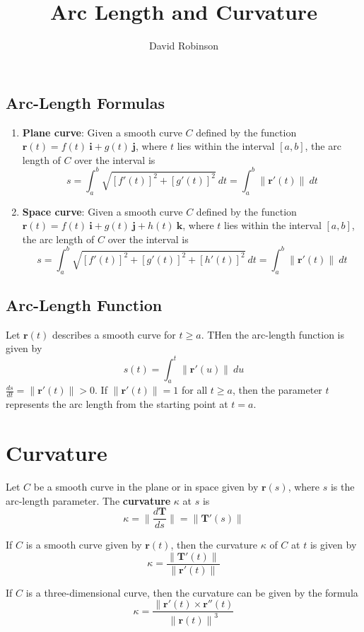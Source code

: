 \documentclass{article}
\title{Arc Length and Curvature}
\author{David Robinson}
\date{}
\begin{document}
\maketitle

\subsection*{Arc-Length Formulas}
\begin{enumerate}
    \item \textbf{Plane curve}: Given a smooth curve $C$ defined by the function $\mathbf{r}(t)=f(t)\:\mathbf{i}+g(t)\:\mathbf{j}$, where $t$ lies within the interval $[a, b]$, the arc length of $C$ over the interval is
    \[s=\int_a^b\sqrt{{[f'(t)]}^2+{[g'(t)]}^2}\: dt=\int_a^b\|\mathbf{r}'(t)\|\: dt\]
    \item \textbf{Space curve}: Given a smooth curve $C$ defined by the function $\mathbf{r}(t)=f(t)\:\mathbf{i}+g(t)\:\mathbf{j}+h(t)\:\mathbf{k}$, where $t$ lies within the interval $[a, b]$, the arc length of $C$ over the interval is
    \[s=\int_a^b\sqrt{{[f'(t)]}^2+{[g'(t)]}^2+{[h'(t)]}^2}\: dt=\int_a^b\|\mathbf{r}'(t)\|\: dt\]
\end{enumerate}

\subsection*{Arc-Length Function}
Let $\mathbf{r}(t)$ describes a smooth curve for $t\geq a$. THen the arc-length function is given by
\[s(t)=\int_a^t\|\mathbf{r}'(u)\|\: du\]
$\frac{ds}{dt}=\|\mathbf{r}'(t)\|>0$. If $\|\mathbf{r}'(t)\|=1$ for all $t\geq a$, then the parameter $t$ represents the arc length from the starting point at $t=a$.

\section*{Curvature}

Let $C$ be a smooth curve in the plane or in space given by $\mathbf{r}(s)$, where $s$ is the arc-length parameter. The \textbf{curvature} $\kappa$ at $s$ is
\[\kappa = \bigg\|\frac{d\mathbf{T}}{ds}\bigg\|=\|\mathbf{T}'(s)\|\]

If $C$ is a smooth curve given by $\mathbf{r}(t)$, then the curvature $\kappa$ of $C$ at $t$ is given by
\[\kappa = \frac{\|\mathbf{T}'(t)\|}{\|\mathbf{r}'(t)\|}\]

If $C$ is a three-dimensional curve, then the curvature can be given by the formula
\[\kappa = \frac{\|\mathbf{r}'(t)\times \mathbf{r}''(t)}{{\|\mathbf{r}(t)\|}^3}\]
\end{document}
